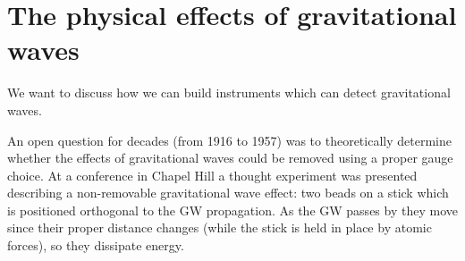 \documentclass[main.tex]{subfiles}
\begin{document}

\section{The physical effects of gravitational waves}

We want to discuss how we can build instruments which can detect gravitational waves. 

An open question for decades (from 1916 to 1957) was to theoretically determine whether the effects of gravitational waves could be removed using a proper gauge choice. 
At a conference in Chapel Hill a thought experiment was presented describing a non-removable gravitational wave effect: two beads on a stick which is positioned orthogonal to the GW propagation. As the GW passes by they move since their proper distance changes (while the stick is held in place by atomic forces), so they dissipate energy. 
\end{document}
